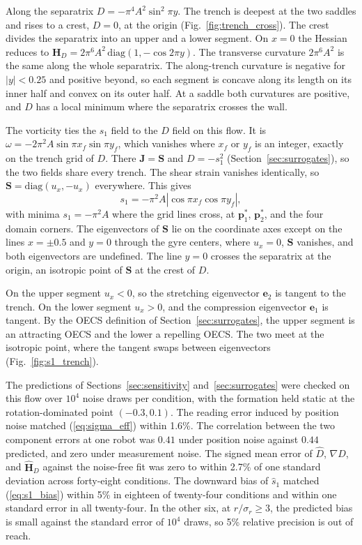\documentclass[lettersize,journal]{IEEEtran}
\begin{document}
Along the separatrix $D = -\pi^4 A^2 \sin^2 \pi y$. The trench is deepest at
the two saddles and rises to a crest, $D = 0$, at the origin
(Fig.~\ref{fig:trench_cross}). The crest divides the separatrix into an upper
and a lower segment. On $x = 0$ the Hessian reduces to
$\mathbf{H}_D = 2\pi^6 A^2\,\mathrm{diag}(1, -\cos 2\pi y)$.
The transverse curvature $2\pi^6 A^2$ is the same along the whole separatrix.
The along-trench curvature is negative for $|y| < 0.25$ and positive beyond, so
each segment is concave along its length on its inner half and convex on its
outer half. At a saddle both curvatures are positive, and $D$ has a local
minimum where the separatrix crosses the wall.

The vorticity ties the $s_1$ field to the $D$ field on this flow. It is
$\omega = -2\pi^2 A \sin\pi x_f \sin\pi y_f$, which vanishes where $x_f$ or
$y_f$ is an integer, exactly on the trench grid of $D$. There
$\mathbf{J} = \mathbf{S}$ and $D = -s_1^2$ (Section~\ref{sec:surrogates}), so
the two fields share every trench. The shear strain vanishes identically, so
$\mathbf{S} = \mathrm{diag}(u_x, -u_x)$ everywhere. This gives
\begin{equation}
s_1 = -\pi^2 A \left|\cos\pi x_f \cos\pi y_f\right|,
\label{eq:s1_analytic_main}
\end{equation}
with minima $s_1 = -\pi^2 A$ where the grid lines cross, at $\mathbf{p}_1^*$,
$\mathbf{p}_2^*$, and the four domain corners. The eigenvectors of
$\mathbf{S}$ lie on the coordinate axes except on the lines $x = \pm 0.5$ and
$y = 0$ through the gyre centers, where $u_x = 0$, $\mathbf{S}$ vanishes, and
both eigenvectors are undefined. The line $y = 0$ crosses the separatrix at
the origin, an isotropic point of $\mathbf{S}$ at the crest of $D$.

On the upper segment $u_x < 0$, so the stretching
eigenvector $\mathbf{e}_2$ is tangent to the trench. On the lower segment
$u_x > 0$, and the compression eigenvector $\mathbf{e}_1$ is tangent. By the
OECS definition of Section~\ref{sec:surrogates}, the upper segment is an
attracting OECS and the lower a repelling OECS. The two meet at the isotropic
point, where the tangent swaps between eigenvectors (Fig.~\ref{fig:s1_trench}).

The predictions of Sections~\ref{sec:sensitivity} and~\ref{sec:surrogates}
were checked on this flow over $10^4$ noise draws per condition, with the
formation held static at the rotation-dominated point $(-0.3, 0.1)$. The
reading error induced by position noise matched (\ref{eq:sigma_eff}) within
1.6\%. The correlation between the two component errors at one robot was
$0.41$ under position noise against $0.44$ predicted, and zero under
measurement noise. The signed mean error of $\hat{D}$, $\nabla\hat{D}$, and
$\hat{\mathbf{H}}_D$ against the noise-free fit was zero to within 2.7\% of
one standard deviation across forty-eight conditions. The downward bias of
$\hat{s}_1$ matched (\ref{eq:s1_bias}) within 5\% in eighteen of
twenty-four conditions and within one standard error in all twenty-four. In
the other six, at $r/\sigma_r \geq 3$, the predicted bias is small against
the standard error of $10^4$ draws, so 5\% relative precision is out of
reach.
\end{document}
